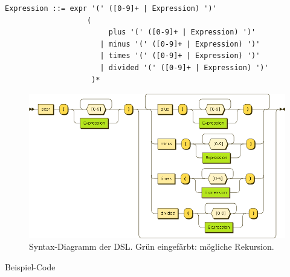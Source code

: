 \begin{lstlisting}[caption={Grammatik der Expression-DSL, spezifiziert in EBNF},label=lst:grammar]
	Expression ::= expr '(' ([0-9]+ | Expression) ')'
	               (
	                    plus '(' ([0-9]+ | Expression) ')'
	                  | minus '(' ([0-9]+ | Expression) ')'
	                  | times '(' ([0-9]+ | Expression) ')'
	                  | divided '(' ([0-9]+ | Expression) ')'
	                )*
\end{lstlisting}

\begin{figure}[H]
\centering\includegraphics[width=.8\textwidth]{images/kapitel4/expressionRailroad.png}
\caption{Syntax-Diagramm der DSL. Grün eingefärbt: mögliche Rekursion.}
\label{fig:railroad}
\end{figure}

Beispiel-Code

